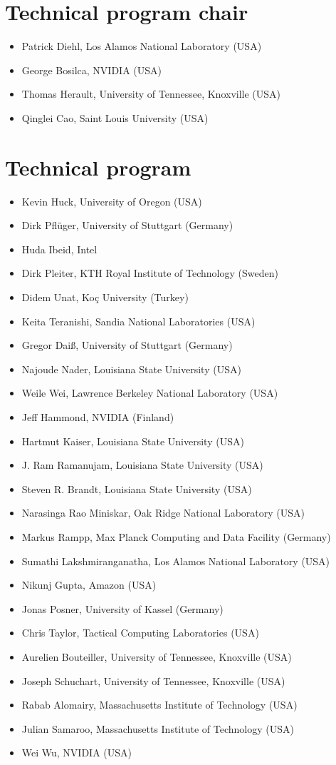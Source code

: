 \section*{Technical program chair}

\begin{itemize}
\item Patrick Diehl, Los Alamos National Laboratory (USA)
\item George Bosilca, NVIDIA (USA)
\item Thomas Herault, University of Tennessee, Knoxville (USA)
\item Qinglei Cao, Saint Louis University (USA) 
\end{itemize}

\section*{Technical program }

\begin{itemize}
\item Kevin Huck, University of Oregon (USA)
\item Dirk Pflüger, University of Stuttgart (Germany)
\item Huda Ibeid, Intel
\item Dirk Pleiter, KTH Royal Institute of Technology (Sweden)
\item Didem Unat, Koç University (Turkey)
\item Keita Teranishi, Sandia National Laboratories (USA)
\item Gregor Daiß, University of Stuttgart (Germany)
\item Najoude Nader, Louisiana State University (USA)
\item Weile Wei, Lawrence Berkeley National Laboratory (USA)
\item Jeff Hammond, NVIDIA (Finland)
\item Hartmut Kaiser, Louisiana State University (USA)
\item J. Ram Ramanujam, Louisiana State University (USA)
\item Steven R. Brandt, Louisiana State University (USA)
\item Narasinga Rao Miniskar, Oak Ridge National Laboratory (USA)
\item Markus Rampp, Max Planck Computing and Data Facility (Germany)
\item Sumathi Lakshmiranganatha, Los Alamos National Laboratory (USA)
\item Nikunj Gupta, Amazon (USA)
\item Jonas Posner, University of Kassel (Germany)
\item Chris Taylor, Tactical Computing Laboratories (USA) 
\item Aurelien Bouteiller, University of Tennessee, Knoxville (USA) 
\item Joseph Schuchart, University of Tennessee, Knoxville (USA) 
\item Rabab Alomairy, Massachusetts Institute of Technology (USA) 
\item Julian Samaroo, Massachusetts Institute of Technology (USA) 
\item Wei Wu, NVIDIA (USA) 
\end{itemize}


